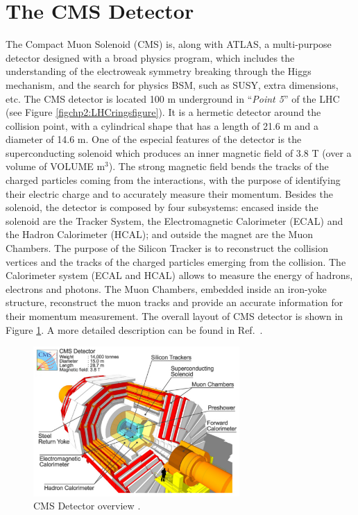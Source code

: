 \section{The CMS Detector}
\label{sec:CMS}

The Compact Muon Solenoid (CMS) is, along with ATLAS, a multi-purpose detector designed 
with a broad physics program, which includes the understanding of the 
electroweak symmetry breaking through the Higgs mechanism, 
and the search for physics BSM, such as SUSY, extra dimensions, etc. The CMS 
detector is located 100 m underground in ``\textit{Point 5}'' of the 
LHC (see Figure \ref{figchp2:LHCringsfigure}). It is a hermetic detector around the collision
point, with a cylindrical shape that has a length of 21.6 m and a diameter of 14.6 m. One of 
the especial features of the detector is the superconducting solenoid which produces an inner magnetic field 
of $3.8$ T (over a volume of VOLUME m$^{3}$). The strong magnetic field bends the tracks 
of the charged particles coming from the interactions, with the purpose of identifying their 
electric charge and to accurately measure their momentum. Besides the solenoid, the detector 
is composed by four subsystems: encased inside the solenoid are the Tracker System, the 
Electromagnetic Calorimeter (ECAL) and the Hadron Calorimeter (HCAL); and outside the 
magnet are the Muon Chambers. The purpose of the Silicon Tracker is to reconstruct 
the collision vertices and the tracks of the charged particles emerging from the 
collision. The Calorimeter system (ECAL and HCAL) allows to measure the energy of hadrons, electrons and 
photons. The Muon Chambers, embedded inside an iron-yoke structure, reconstruct the 
muon tracks and provide an accurate information for their momentum measurement. The overall layout of CMS detector is shown 
in Figure \ref{figchp2:CMSdetectorfigure}. A more detailed description can be found in Ref.~\cite{chp2:CMS}. 

\begin{figure}[ht]
    \begin{center}
      \includegraphics[width=0.7\textwidth]{figuras/Chapter2/CMSdetector.pdf}
       \caption{CMS Detector overview \cite{chp2:CMSTDR}.}\label{figchp2:CMSdetectorfigure}
\end{center}
\end{figure}


